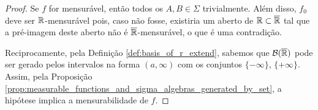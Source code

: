 \begin{proof}
    Se $f$ for mensurável, então todos os $A,B\in\Sigma$ trivialmente. Além disso, $f_0$ deve ser $\mathbb{R}$-mensurável pois, caso não fosse, existiria um aberto de $\mathbb{R}\subset \overline{\mathbb{R}}$ tal que a pré-imagem deste aberto não é $\overline{\mathbb{R}}$-mensurável, o que é uma contradição.
    
    Reciprocamente, pela Definição \ref{def:basis_of_r_extend}, sabemos que $\mathcal{B}(\overline{\mathbb{R}})$ pode ser gerado pelos intervalos na forma $(a,\infty)$ com os conjuntos $\{-\infty\}$, $\{+\infty\}$. Assim, pela Proposição \ref{prop:measurable_functions_and_sigma_algebras_generated_by_set}, a hipótese implica a mensurabilidade de $f$. 
\end{proof}